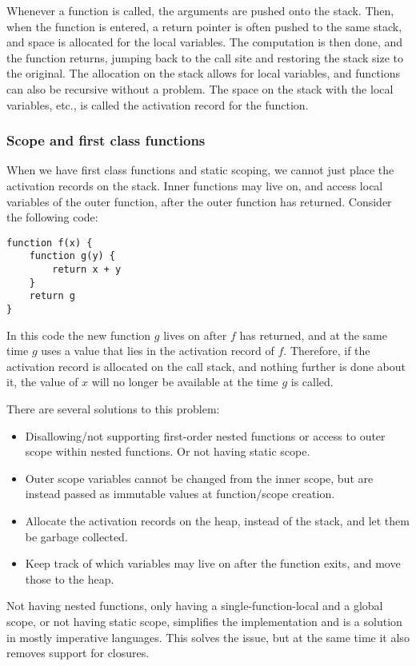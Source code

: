 \documentclass[11pt]{report}
\begin{document}
Whenever a function is called, the arguments are pushed onto the stack. Then, when the function is entered, a return pointer is often pushed to the same stack, and space is allocated for the local variables. The computation is then done, and the function returns, jumping back to the call site and restoring the stack size to the original.
The allocation on the stack allows for local variables, and functions can also be recursive without a problem. The space on the stack with the local variables, etc., is called the activation record for the function.

\subsubsection{Scope and first class functions}
\label{funarg}

When we have first class functions and static scoping, we cannot just place the activation records on the stack. Inner functions may live on, and access local variables of the outer function, after the outer function has returned. Consider the following code:
\begin{verbatim}
function f(x) {
    function g(y) {
        return x + y
    }
    return g
}
\end{verbatim}

In this code the new function $g$ lives on after $f$ has returned, and at the same time $g$ uses a value that lies in the activation record of $f$. Therefore, if the activation record is allocated on the call stack, and nothing further is done about it, the value of $x$ will no longer be available at the time $g$ is called.

There are several solutions to this problem:
\begin{itemize}
\item Disallowing/not supporting first-order nested functions or access to outer scope within nested functions. Or not having static scope.
\item Outer scope variables cannot be changed from the inner scope, but are instead passed as immutable values at function/scope creation. 
\item Allocate the activation records on the heap, instead of the stack, and let them be garbage collected. 
\item Keep track of which variables may live on after the function exits, and move those to the heap.
\end{itemize}

Not having nested functions, only having a single-function-local and a global scope, or not having static scope, simplifies the implementation and is a solution in mostly imperative languages.
This solves the issue, but at the same time it also removes support for closures.
\end{document}

